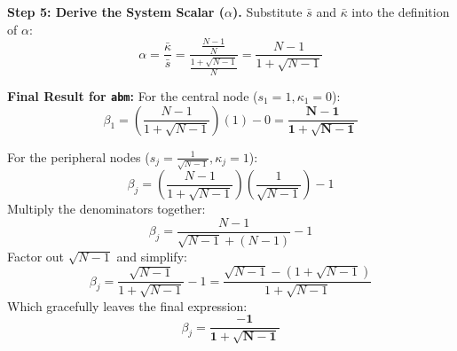 \textbf{Step 5: Derive the System Scalar ($\alpha$).}
Substitute $\bar{s}$ and $\bar{\kappa}$ into the definition of $\alpha$:
\begin{equation}
    \alpha = \frac{\bar{\kappa}}{\bar{s}} = \frac{\frac{N-1}{N}}{\frac{1 + \sqrt{N-1}}{N}} = \frac{N-1}{1 + \sqrt{N-1}}
\end{equation}

\textbf{Final Result for \texttt{abm}:}
For the central node ($s_1 = 1, \kappa_1 = 0$):
\begin{equation}
    \beta_1 = \left( \frac{N-1}{1 + \sqrt{N-1}} \right)(1) - 0 = \mathbf{\frac{N-1}{1 + \sqrt{N-1}}}
\end{equation}

For the peripheral nodes ($s_j = \frac{1}{\sqrt{N-1}}, \kappa_j = 1$):
\begin{equation}
    \beta_j = \left( \frac{N-1}{1 + \sqrt{N-1}} \right) \left( \frac{1}{\sqrt{N-1}} \right) - 1
\end{equation}
Multiply the denominators together:
\begin{equation}
    \beta_j = \frac{N-1}{\sqrt{N-1} + (N-1)} - 1
\end{equation}
Factor out $\sqrt{N-1}$ and simplify:
\begin{equation}
    \beta_j = \frac{\sqrt{N-1}}{1 + \sqrt{N-1}} - 1 = \frac{\sqrt{N-1} - (1 + \sqrt{N-1})}{1 + \sqrt{N-1}}
\end{equation}
Which gracefully leaves the final expression:
\begin{equation}
    \beta_j = \mathbf{\frac{-1}{1 + \sqrt{N-1}}}
\end{equation}
